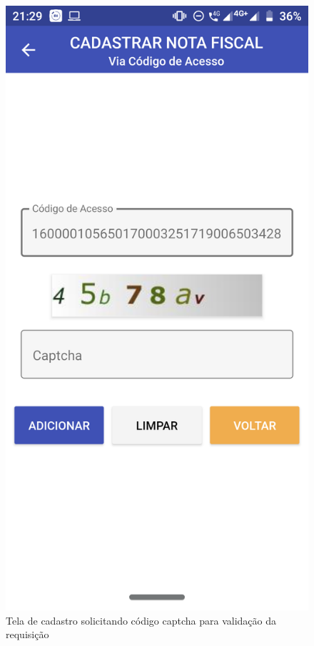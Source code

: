 \newpage
\begin{figure}[h]
    \centering
    \includegraphics[scale=0.15]{tcc/figures/app/app_codigo_acesso_captcha.png}
    \caption{Tela de cadastro solicitando código captcha para validação da requisição}
    \label{appCodigoAcessoCaptchaFig}
\end{figure}


